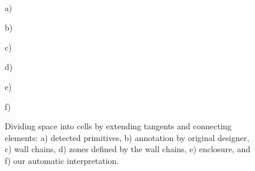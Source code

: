 \begin{figure}[t]
\vspace{-0.35in}
\\
\begin{minipage}{0.74in}\textcolor[rgb]{0,0,0}{\hspace{-0.01in} { a)}} \end{minipage}
\begin{minipage}{0.74in}\textcolor[rgb]{0,0,0}{\hspace{-0.01in} { b)}} \end{minipage}
\begin{minipage}{0.74in}\textcolor[rgb]{0,0,0}{\hspace{-0.01in} { c)}} \end{minipage}
\begin{minipage}{0.74in}\textcolor[rgb]{0,0,0}{\hspace{-0.01in} { d)}} \end{minipage}
\begin{minipage}{0.74in}\textcolor[rgb]{0,0,0}{\hspace{-0.01in} { e)}} \end{minipage}
\begin{minipage}{0.74in}\textcolor[rgb]{0,0,0}{\hspace{-0.01in} { f)}} \end{minipage}
\caption{Dividing space into cells by extending tangents and connecting
  elements:  a) detected primitives, b) annotation by original designer,
  c) wall chains, d) zones defined by the wall chains, e) enclosure, and f)
  our automatic interpretation. }
\label{figure:cells}
\end{figure}
